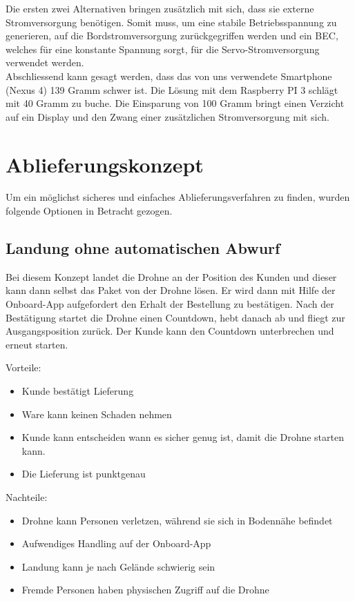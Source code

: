 Die ersten zwei Alternativen bringen zusätzlich mit sich, dass sie externe Stromversorgung benötigen. Somit muss, um eine stabile Betriebsspannung zu generieren, auf die Bordstromversorgung zurückgegriffen werden und ein \Gls{BEC}, welches für eine konstante Spannung sorgt, für die Servo-Stromversorgung verwendet werden. \\

Abschliessend kann gesagt werden, dass das von uns verwendete Smartphone (Nexus 4) 139 Gramm schwer ist. Die Lösung mit dem Raspberry PI 3 schlägt mit 40 Gramm zu buche. Die Einsparung von 100 Gramm bringt einen Verzicht auf ein Display und den Zwang einer zusätzlichen Stromversorgung mit sich.


\section{Ablieferungskonzept}
\label{chap:ablieferung}
Um ein möglichst sicheres und einfaches Ablieferungsverfahren zu finden, wurden folgende Optionen in Betracht gezogen.

\subsection{Landung ohne automatischen Abwurf}

Bei diesem Konzept landet die Drohne an der Position des Kunden und dieser kann dann selbst das Paket von der Drohne lösen. Er wird dann mit Hilfe der Onboard-App aufgefordert den Erhalt der Bestellung zu bestätigen. Nach der Bestätigung startet die Drohne einen Countdown, hebt danach ab und fliegt zur Ausgangsposition zurück. Der Kunde kann den Countdown unterbrechen und erneut starten.

Vorteile:
\begin{itemize}
	\item Kunde bestätigt Lieferung
	\item Ware kann keinen Schaden nehmen
	\item Kunde kann entscheiden wann es sicher genug ist, damit die Drohne starten kann.
	\item Die Lieferung ist punktgenau 
\end{itemize}


Nachteile:
\begin{itemize}
	\item Drohne kann Personen verletzen, während sie sich in Bodennähe befindet
	\item Aufwendiges Handling auf der Onboard-App
	\item Landung kann je nach Gelände schwierig sein 
	\item Fremde Personen haben physischen Zugriff auf die Drohne
\end{itemize}

